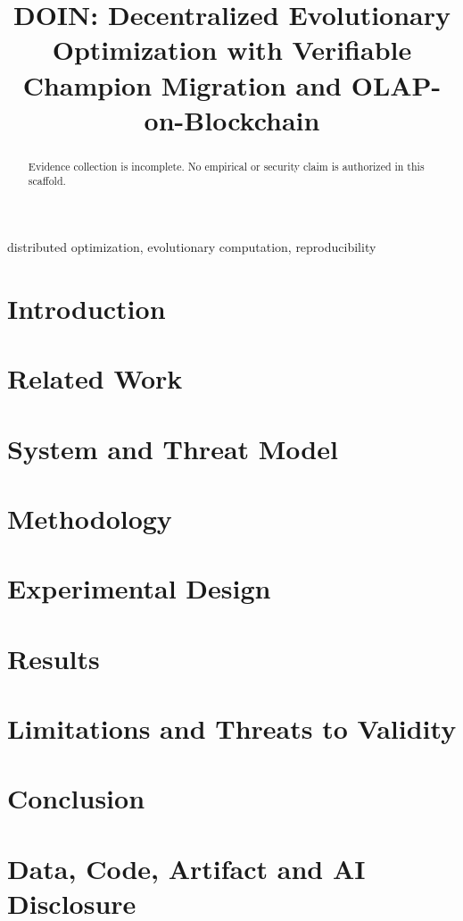 \documentclass[conference]{IEEEtran}
\title{DOIN: Decentralized Evolutionary Optimization with Verifiable Champion Migration and OLAP-on-Blockchain}
\author{\IEEEauthorblockN{Harvey}}
\begin{document}
\maketitle
\begin{abstract}
Evidence collection is incomplete. No empirical or security claim is authorized in this scaffold.
\end{abstract}
\begin{IEEEkeywords}
distributed optimization, evolutionary computation, reproducibility
\end{IEEEkeywords}
\section{Introduction}
\section{Related Work}
\section{System and Threat Model}
\section{Methodology}
\section{Experimental Design}
\section{Results}
\section{Limitations and Threats to Validity}
\section{Conclusion}
\section*{Data, Code, Artifact and AI Disclosure}


\end{document}
